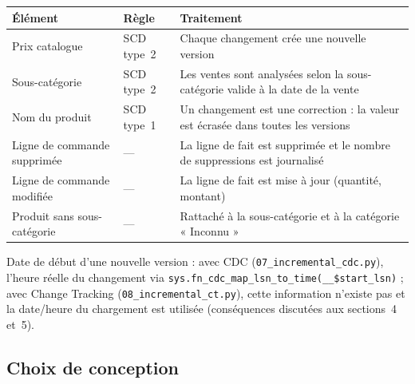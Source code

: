 \documentclass[9pt,a4paper]{article}
\begin{document}
\begingroup\small
\begin{tabularx}{\textwidth}{@{}>{\raggedright\arraybackslash}p{3.6cm}>{\raggedright\arraybackslash}p{2.3cm}X@{}}
\toprule
Élément & Règle & Traitement \\
\midrule
Prix catalogue & SCD type~2 & Chaque changement crée une nouvelle version \\
Sous-catégorie & SCD type~2 & Les ventes sont analysées selon la sous-catégorie valide à la date de la vente \\
Nom du produit & SCD type~1 & Un changement est une correction : la valeur est écrasée dans toutes les versions \\
Ligne de commande supprimée & --- & La ligne de fait est supprimée et le nombre de suppressions est journalisé \\
Ligne de commande modifiée & --- & La ligne de fait est mise à jour (quantité, montant) \\
Produit sans sous-catégorie & --- & Rattaché à la sous-catégorie et à la catégorie « Inconnu » \\
\bottomrule
\end{tabularx}
\endgroup

Date de début d'une nouvelle version : avec CDC (\texttt{07\_incremental\_cdc.py}), l'heure réelle du changement via \texttt{sys.fn\_cdc\_map\_lsn\_to\_time(\_\_\$start\_lsn)} ; avec Change Tracking (\texttt{08\_incremental\_ct.py}), cette information n'existe pas et la date/heure du chargement est utilisée (conséquences discutées aux sections~4 et~5).

\subsection{Choix de conception}
\end{document}
